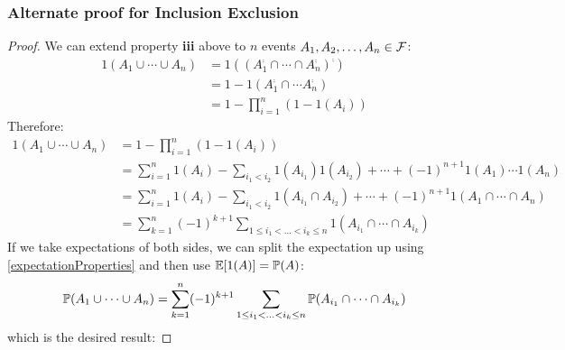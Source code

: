 \documentclass[../main.tex]{subfiles}
\begin{document}
\subsubsection{Alternate proof for Inclusion Exclusion}
\begin{proof}
  We can extend property \textbf{iii} above to $n$ events $A_1, A_2, \ldots, A_n \in \salg$:
  \begin{align*}
    1(A_1 \cup \cdots \cup A_n) &= 1((A^{\comp}_1 \cap \cdots \cap A^{\comp}_n)^{\comp}) \\
                                &= 1 - 1(A^{\comp}_1 \cap \cdots A^{\comp}_n) \\
                                &= 1 - \prod_{i = 1}^{n} (1 - 1(A_i))
  \end{align*}
  Therefore:
  \begin{align*}
    1(A_1 \cup \cdots \cup A_n) &= 1 - \prod_{i = 1}^{n} (1 - 1(A_i)) \\
                                &= \sum_{i = 1}^{n} 1(A_i) - \sum_{i_1 < i_2} 1(A_{i_1})1(A_{i_2}) + \cdots + (-1)^{n + 1}1(A_1)\cdots1(A_n) \\
                                &= \sum_{i = 1}^{n} 1(A_i) - \sum_{i_1 < i_2} 1(A_{i_1} \cap A_{i_2}) + \cdots + (-1)^{n + 1}1(A_1 \cap \cdots \cap A_n) \\
                                &= \sum_{k = 1}^{n} (-1)^{k + 1} \sum_{1 \leq i_1 < \ldots < i_k \leq n} 1(A_{i_1} \cap \cdots \cap A_{i_k})
  \end{align*}
  If we take expectations of both sides, we can split the expectation up using \cref{expectationProperties} and then use $\E[1(A)] = \P(A)$:
  \[
    \P(A_1 \cup \cdots \cup A_n) = \sum_{k = 1}^{n} (-1)^{k + 1} \sum_{1 \leq i_1 < \ldots < i_k \leq n} \P(A_{i_1} \cap \cdots \cap A_{i_k})
  \]
  which is the desired result:
\end{proof}
\end{document}
